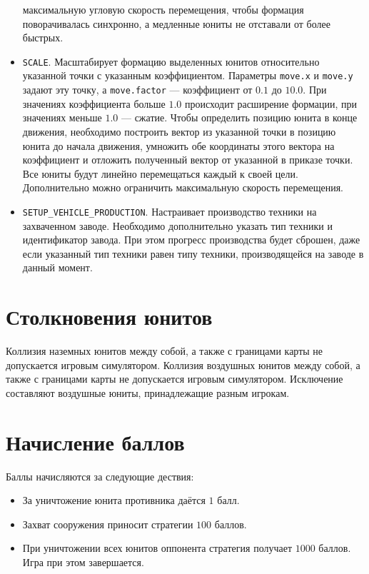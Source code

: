 \begin{itemize}
          максимальную угловую скорость перемещения, чтобы формация поворачивалась синхронно, а медленные юниты не отставали от более
          быстрых.
    \item \texttt{SCALE}. Масштабирует формацию выделенных юнитов относительно указанной точки с указанным коэффициентом. Параметры
          \texttt{move.x} и \texttt{move.y} задают эту точку, а \texttt{move.factor} --- коэффициент от $0.1$ до $10.0$. При значениях
          коэффициента больше $1.0$ происходит расширение формации, при значениях меньше $1.0$ --- сжатие. Чтобы определить позицию юнита в
          конце движения, необходимо построить вектор из указанной точки в позицию юнита до начала движения, умножить обе координаты этого
          вектора на коэффициент и отложить полученный вектор от указанной в приказе точки. Все юниты будут линейно перемещаться каждый к
          своей цели. Дополнительно можно ограничить максимальную скорость перемещения.
    \item \texttt{SETUP\_VEHICLE\_PRODUCTION}. Настраивает производство техники на захваченном заводе. Необходимо дополнительно указать тип
          техники и идентификатор завода. При этом прогресс производства будет сброшен, даже если указанный тип техники равен типу техники,
          производящейся на заводе в данный момент.
\end{itemize}

\section{Столкновения юнитов}

Коллизия наземных юнитов между собой, а также с границами карты не допускается игровым симулятором. Коллизия воздушных юнитов между собой, а
также с границами карты не допускается игровым симулятором. Исключение составляют воздушные юниты, принадлежащие разным игрокам.

\section{Начисление баллов}

Баллы начисляются за следующие дествия:
\begin{itemize}
    \item За уничтожение юнита противника даётся $1$ балл.
    \item Захват сооружения приносит стратегии $100$ баллов.
    \item При уничтожении всех юнитов оппонента стратегия получает $1000$ баллов. Игра при этом завершается.
\end{itemize}

